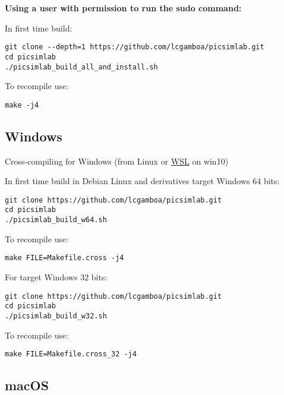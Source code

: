 \textbf{Using a user with permission to run the sudo command:}

In first time build:
\begin{verbatim}
git clone --depth=1 https://github.com/lcgamboa/picsimlab.git
cd picsimlab
./picsimlab_build_all_and_install.sh
\end{verbatim}

To recompile use:
\begin{verbatim}
make -j4
\end{verbatim}

\subsection{Windows}

 Cross-compiling for Windows (from Linux or \href{https://docs.microsoft.com/windows/wsl/install-win10}{WSL} on win10)

In first time build in Debian Linux and derivatives target Windows 64 bits:

 \begin{verbatim}
git clone https://github.com/lcgamboa/picsimlab.git
cd picsimlab
./picsimlab_build_w64.sh
\end{verbatim}

To recompile use:

\begin{verbatim}
make FILE=Makefile.cross -j4 
\end{verbatim}

For target Windows 32 bits:

\begin{verbatim}
git clone https://github.com/lcgamboa/picsimlab.git
cd picsimlab
./picsimlab_build_w32.sh
\end{verbatim}

To recompile use:
\begin{verbatim}
make FILE=Makefile.cross_32 -j4 
\end{verbatim}

\subsection{macOS}

